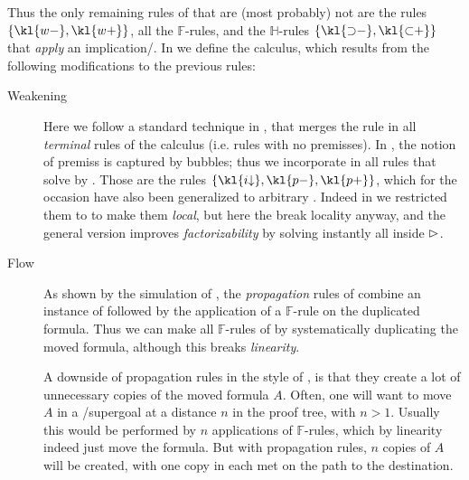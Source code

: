 \begin{scope}
Thus the only remaining rules of  that are (most probably) not
 are the  rules $\{\kl{w{-}},\kl{w{+}}\}$, all the
$\mathbb{F}$-rules, and the $\mathbb{H}$-rules $\{\kl{{\limp}{-}},
\kl{{\lsub}{+}}\}$ that \emph{apply} an implication/.
In  we define the  calculus, which results
from the following modifications to the previous rules:
\begin{description}
  \item[Weakening]
    Here we follow a standard technique in , that merges
    the  rule in all \emph{terminal} rules of the calculus (i.e.
    rules with no premisses). In , the notion of premiss is
    captured by  bubbles; thus we incorporate  in all
    rules that solve  by  .
    Those are the rules $\{\kl{i{\da}},\kl{p{-}},\kl{p{+}}\}$, which for the
    occasion have also been generalized to arbitrary . Indeed in
     we restricted them to   to make
    them \emph{local}, but here the  break locality anyway, and
    the general version improves \emph{factorizability} by solving instantly all
     inside $\mathbin{\rhd}$.

  \item[Flow]
    As shown by the simulation of , the
    \emph{propagation} rules of  combine an instance of
    \emph{} followed by the application of a $\mathbb{F}$-rule
    on the duplicated formula. Thus we can make all $\mathbb{F}$-rules of
      by systematically duplicating the moved
    formula, although this breaks \emph{linearity}.

    A downside of propagation rules in the style of , is that they
    create a lot of unnecessary copies of the moved formula $A$. Often, one will
    want to move $A$ in a /supergoal at a distance $n$ in the proof tree,
    with $n > 1$. Usually this would be performed by $n$ applications of
    $\mathbb{F}$-rules, which by linearity indeed just move the formula. But with
    propagation rules, $n$ copies of $A$ will be created, with one copy in each
     met on the path to the destination.


\end{description}
\end{scope}
